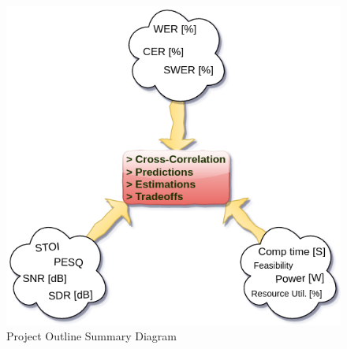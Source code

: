 \begin{figure}[H]
    \centering
    \includegraphics[width=0.75\linewidth]{Introduction/images/metrics_cross_blocks}
    \caption{Project Outline Summary Diagram}\label{fig:metrics_cross_blocks}
\end{figure}

\bigskip






